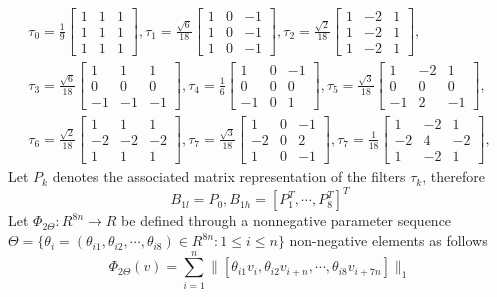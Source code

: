 \documentclass[UTF8]{article}
\renewcommand{\le}{\leqslant}
\renewcommand{\le}{\leqslant}
\begin{document}
\begin{align*}
	\tau_0=\frac{1}{9}\begin{bmatrix}
		1 & 1 & 1\\
		1 & 1 & 1\\
		1 & 1 & 1
	\end{bmatrix},
	\tau_1=\frac{\sqrt{6}}{18}\begin{bmatrix}
		1 & 0 & -1\\
		1 & 0 & -1\\
		1 & 0 & -1
	\end{bmatrix},
	\tau_2=\frac{\sqrt{2}}{18}\begin{bmatrix}
		1 & -2 & 1\\
		1 & -2 & 1\\
		1 & -2 & 1
	\end{bmatrix},\\
	\tau_3=\frac{\sqrt{6}}{18}\begin{bmatrix}
		1 & 1 & 1\\
		0 & 0 & 0\\
		-1 & -1 & -1
	\end{bmatrix},
	\tau_4=\frac{1}{6}\begin{bmatrix}
		1 & 0 & -1\\
		0 & 0 & 0\\
		-1 & 0 & 1
	\end{bmatrix},
	\tau_5=\frac{\sqrt{3}}{18}\begin{bmatrix}
		1 & -2 & 1\\
		0 & 0 & 0\\
		-1 & 2 & -1
	\end{bmatrix},  \\
	\tau_6=\frac{\sqrt{2}}{18}\begin{bmatrix}
		1 & 1 & 1\\
		-2 & -2 & -2\\
		1 & 1 & 1
	\end{bmatrix}, 
	\tau_7=\frac{\sqrt{3}}{18}\begin{bmatrix}
		1 & 0 & -1\\
		-2 & 0 & 2\\
		1 & 0 & -1
	\end{bmatrix},
	\tau_7=\frac{1}{18}\begin{bmatrix}
		1 & -2 & 1\\
		-2 & 4 & -2\\
		1 & -2 & 1
	\end{bmatrix},
\end{align*}
Let $P_k$ denotes the associated matrix representation of the filters $\tau_k$, therefore
\begin{equation*}
	B_{1l} = P_0 , B_{1h} = [P_1^T,\cdots, P_8^T]^T
\end{equation*}
Let $\Phi_{2 \Theta} : R^{8n} \rightarrow R$ be defined through a nonnegative parameter sequence $\Theta = \{\theta_i = (\theta_{i1}, \theta_{i2}, \cdots , \theta_{i8}) \in R^{8n} : 1\le i \le n\}$  non-negative elements as follows
\begin{equation*}
	\Phi_{2 \Theta}(v) = \sum_{i=1}^{n} \|[\theta_{i1}v_i, \theta_{i2} v_{i+n}, \cdots, \theta_{i8} v_{i+7n} ]\|_1
\end{equation*}
\end{document}
